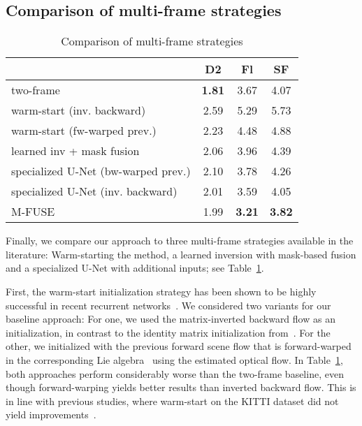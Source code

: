 \documentclass[10pt,twocolumn,letterpaper]{article}
\begin{document}
\subsection{Comparison of multi-frame strategies}
\begin{table}
\setlength\tabcolsep{4pt}
\caption{Comparison of multi-frame strategies}
\label{tab:comparisonStrategies}
\begin{center}
\begin{tabular}{lccc}
\toprule
& D2 & Fl & SF
\\
\midrule
\midrule
two-frame & \textbf{1.81} & 3.67 & 4.07
\\
\midrule
warm-start (inv. backward) & 2.59 & 5.29 & 5.73
\\
warm-start (fw-warped prev.) & 2.23 & 4.48 & 4.88
\\
\midrule
learned inv + mask fusion & 2.06 & 3.96 & 4.39
\\
\midrule
specialized U-Net (bw-warped prev.) & 2.10 & 3.78 & 4.26
\\
specialized U-Net (inv. backward) & 2.01 & 3.59 & 4.05
\\
\midrule
M-FUSE & 1.99 & \textbf{3.21} & \textbf{3.82}
\\
\bottomrule
\end{tabular}
\end{center}
\end{table}

Finally, we compare our approach to three multi-frame strategies available in the literature:
Warm-starting the method, a learned inversion with mask-based fusion and a specialized U-Net with additional inputs; see Table~\ref{tab:comparisonStrategies}.

First, the warm-start initialization strategy has been shown to be highly successful in recent recurrent networks~\cite{Teed2020_RAFT}.
We considered two variants for our baseline approach:
For one, we used the matrix-inverted backward flow as an initialization, in contrast to the identity matrix initialization from~\cite{Teed2021_RAFT3D}.
For the other, we initialized with the previous forward scene flow that is forward-warped in the corresponding Lie algebra~\cite{Teed2021_Lie} using the estimated optical flow.
In Table~\ref{tab:comparisonStrategies}, both approaches perform considerably worse than the two-frame baseline,
even though forward-warping yields better results than inverted backward flow.
This is in line with previous studies, where warm-start on the KITTI dataset did not yield improvements~\cite{Teed2020_RAFT}.
\end{document}
